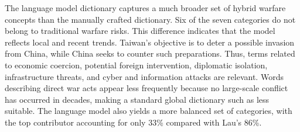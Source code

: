 The language model dictionary captures a much broader set of hybrid warfare
concepts than the manually crafted dictionary. Six of the seven categories do
not belong to traditional warfare risks. This difference indicates that the
model reflects local and recent trends. Taiwan's objective is to deter a
possible invasion from China, while China seeks to counter such preparations.
Thus, terms related to economic coercion, potential foreign intervention,
diplomatic isolation, infrastructure threats, and cyber and information
attacks are relevant. Words describing direct war acts appear less frequently
because no large-scale conflict has occurred in decades, making a standard
global dictionary such as \citet{caldara2013geopoliticalrisk} less suitable.
The language model also yields a more balanced set of categories, with the top
contributor accounting for only 33\% compared with Lau's 86\%.

